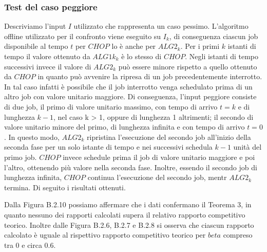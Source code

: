 \documentclass[12pt]{article}
\begin{document}
\subsubsection{Test del caso peggiore}
Descriviamo l'input $I$ utilizzato che rappresenta un caso pessimo. L'algoritmo offline utilizzato per il confronto viene eseguito su $I_{k}$, di conseguenza ciascun job disponibile al tempo $t$ per $CHOP$ lo è anche per $ALG2_{k}$. Per i primi $k$ istanti di tempo il valore ottenuto da $ALG1k_{k}$ è lo stesso di $CHOP$. Negli istanti di tempo successivi invece il valore di $ALG2_{k}$ può essere minore rispetto a quello ottenuto da $CHOP$ in quanto può avvenire la ripresa di un job precedentemente interrotto. In tal caso infatti è possibile che il job interrotto venga schedulato prima di un altro job con valore unitario maggiore. Di conseguenza, l'input peggiore consiste di due job, il primo di valore unitario massimo, con tempo di arrivo $t = k$ e di lunghezza $k - 1$, nel caso k > 1, oppure di lunghezza 1 altrimenti; il secondo di valore unitario minore del primo, di lunghezza infinita e con tempo di arrivo $t = 0$. In questo modo, $ALG2_{k}$ ripristina l'esecuzione del secondo job all'inizio della seconda fase per un solo istante di tempo e nei successivi schedula $k - 1$ unità del primo job. $CHOP$ invece schedule prima il job di valore unitario maggiore e poi l'altro, ottenendo più valore nella seconda fase. Inoltre, essendo il secondo job di lunghezza infinita, $CHOP$ continua l'esecuzione del secondo job, mentr $ALG2_{k}$ termina. Di seguito i risultati ottenuti.

Dalla Figura B.2.10 possiamo affermare che i dati confermano il Teorema 3, in quanto nessuno dei rapporti calcolati supera il relativo rapporto competitivo teorico. Inoltre dalle Figura B.2.6, B.2.7 e B.2.8 si osserva che ciascun rapporto calcolato è uguale al rispettivo rapporto competitivo teorico per $beta$ compreso tra 0 e circa 0.6.
\end{document}
